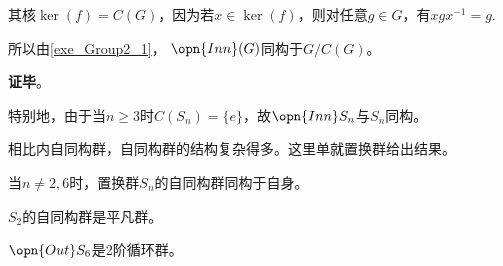 其核$\ker(f)=C(G)$，因为若$x\in\ker(f)$，则对任意$g\in G$，有$xgx^{-1}=g$.

所以由\autoref{exe_Group2_1}， $\opn{Inn}(G)$同构于$G/C(G)$。

\textbf{证毕}。

特别地，由于当$n\geq 3$时$C(S_n)=\{e\}$，故$\opn{Inn} S_n$与$S_n$同构。

相比内自同构群，自同构群的结构复杂得多。这里单就置换群给出结果。

\begin{theorem}{}
当$n\neq 2,6$时，置换群$S_n$的自同构群同构于自身。

$S_2$的自同构群是平凡群。

$\opn{Out} S_6$是2阶循环群。
\end{theorem}
